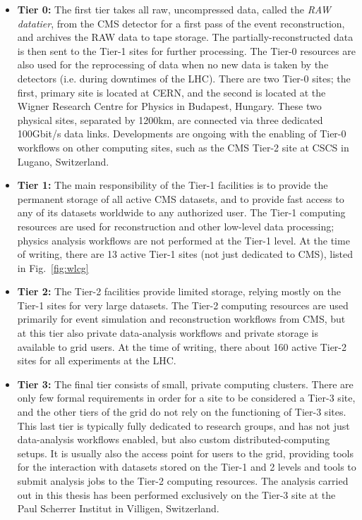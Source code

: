 \begin{itemize}
\item \textbf{Tier 0:} The first tier takes all raw, uncompressed data, called the \emph{RAW datatier}, from the CMS detector for a first pass of the event reconstruction, and archives the RAW data to tape storage.
% 
The partially-reconstructed data is then sent to the Tier-1 sites for further processing.
% 
The Tier-0 resources are also used for the reprocessing of data when no new data is taken by the detectors (i.e. during downtimes of the LHC).
% 
There are two Tier-0 sites; the first, primary site is located at CERN, and the second is located at the Wigner Research Centre for Physics in Budapest, Hungary.
% 
These two physical sites, separated by 1200\unit{km}, are connected via three dedicated 100\unit{Gbit/s} data links.
% 
Developments are ongoing with the enabling of Tier-0 workflows on other computing sites, such as the CMS Tier-2 site at CSCS in Lugano, Switzerland.
% 
\item \textbf{Tier 1:} The main responsibility of the Tier-1 facilities is to provide the permanent storage of all active CMS datasets, and to provide fast access to any of its datasets worldwide to any authorized user.
% 
The Tier-1 computing resources are used for reconstruction and other low-level data processing; physics analysis workflows are not performed at the Tier-1 level.
% 
At the time of writing, there are 13 active Tier-1 sites (not just dedicated to CMS), listed in Fig.~\ref{fig:wlcg}
% 
\item \textbf{Tier 2:} The Tier-2 facilities provide limited storage, relying mostly on the Tier-1 sites for very large datasets.
% 
The Tier-2 computing resources are used primarily for event simulation and reconstruction workflows from CMS, but at this tier also private data-analysis workflows and private storage is available to grid users.
% 
At the time of writing, there about 160 active Tier-2 sites for all experiments at the LHC.
% 
\item \textbf{Tier 3:} The final tier consists of small, private computing clusters.
% 
There are only few formal requirements in order for a site to be considered a Tier-3 site, and the other tiers of the grid do not rely on the functioning of Tier-3 sites.
% 
This last tier is typically fully dedicated to research groups, and has not just data-analysis workflows enabled, but also custom distributed-computing setups.
% 
It is usually also the access point for users to the grid, providing tools for the interaction with datasets stored on the Tier-1 and 2 levels and tools to submit analysis jobs to the Tier-2 computing resources.
% 
The analysis carried out in this thesis has been performed exclusively on the Tier-3 site at the Paul Scherrer Institut in Villigen, Switzerland.
% 
\end{itemize}


